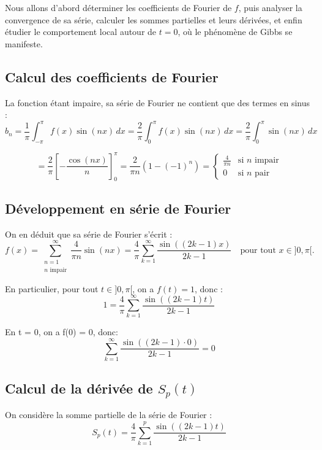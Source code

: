 \documentclass[11pt]{article} %
\begin{document}
\begin{large}
Nous allons d'abord déterminer les coefficients de Fourier de \( f \), puis analyser la convergence de sa série, calculer les sommes partielles et leurs dérivées, et enfin étudier le comportement local autour de \( t = 0 \), où le phénomène de Gibbs se manifeste.




\subsection{Calcul des coefficients de Fourier}

La fonction étant impaire, sa série de Fourier ne contient que des termes en sinus :
\[
b_n = \frac{1}{\pi} \int_{-\pi}^{\pi} f(x) \sin(nx) \, dx
= \frac{2}{\pi} \int_0^{\pi} f(x) \sin(nx) \, dx
= \frac{2}{\pi} \int_0^{\pi} \sin(nx) \, dx
\]

\[
= \frac{2}{\pi} \left[ -\frac{\cos(nx)}{n} \right]_0^\pi
= \frac{2}{\pi n} (1 - (-1)^n)
=
\begin{cases}
\frac{4}{\pi n} & \text{si } n \text{ impair} \\
0 & \text{si } n \text{ pair}
\end{cases}
\]

\subsection{Développement en série de Fourier}

On en déduit que sa série de Fourier s'écrit :
\[
f(x) = \sum_{\substack{n=1 \\ n \text{ impair}}}^{\infty} \frac{4}{\pi n} \sin(nx)
= \frac{4}{\pi} \sum_{k=1}^\infty \frac{\sin((2k-1)x)}{2k - 1}
\quad \text{pour tout } x \in ]0, \pi[.
\]
 


En particulier, pour tout $t \in ]0, \pi[$, on a $f(t) = 1$, donc :
\[
1 = \frac{4}{\pi} \sum_{k=1}^{\infty} \frac{\sin((2k - 1)t)}{2k - 1}
\]

En t = 0, on a f(0) = 0,
donc:
\[
\sum_{k=1}^{\infty} \frac{\sin((2k - 1) \cdot 0)}{2k - 1} = 0
\]


\subsection{Calcul de la dérivée de $S_p(t)$}



On considère la somme partielle de la série de Fourier :
\[
S_p(t) = \frac{4}{\pi} \sum_{k=1}^{p} \frac{\sin((2k - 1)t)}{2k - 1}
\]


\end{large}
\end{document}
